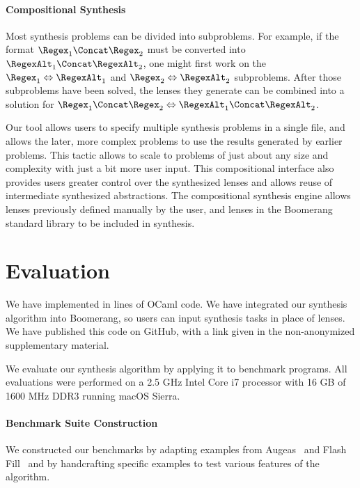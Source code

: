 \documentclass[sigplan,acmsmall]{acmart}
\begin{document}
\paragraph*{Compositional Synthesis}
Most synthesis problems can be divided into subproblems.  For example, if the
format $\Regex_1 \Concat \Regex_2$ must be converted into $\RegexAlt_1 \Concat
\RegexAlt_2$, one might first work on the $\Regex_1 \Leftrightarrow \RegexAlt_1$ and
$\Regex_2 \Leftrightarrow \RegexAlt_2$ subproblems.  After those subproblems have
been solved, the lenses they generate can be combined into a solution for
$\Regex_1 \Concat \Regex_2 \Leftrightarrow \RegexAlt_1 \Concat \RegexAlt_2$.

Our tool allows users to specify multiple synthesis problems in a single file,
and allows the later, more complex problems to use the results generated by
earlier problems.  This tactic allows \Optician{} to scale to problems of just
about any size and complexity with just a bit more user input.  This
compositional interface also provides users greater control over the
synthesized lenses and allows reuse of intermediate synthesized abstractions.
The compositional synthesis engine allows
lenses previously defined manually by the user, and lenses in the Boomerang standard
library to be included in synthesis.



\section{Evaluation}
\label{evaluation}

We have implemented \Optician{} in \LOC{} lines
of OCaml code.  We have integrated our synthesis algorithm into Boomerang, so
users can input synthesis tasks in place of lenses.  We have published this code
on GitHub, with a link given in the non-anonymized supplementary material.

We evaluate our synthesis algorithm by applying it to \BenchmarkCount{}
benchmark programs.
All evaluations were performed on a 2.5 GHz Intel Core i7 processor with 16 GB
of 1600 MHz DDR3 running macOS Sierra.

\paragraph*{Benchmark Suite Construction}
We constructed our benchmarks by adapting examples from
Augeas~\cite{augeas} and 
Flash Fill~\cite{gulwani-popl-2014} and by handcrafting specific
examples to test various features of the algorithm.
\end{document}
